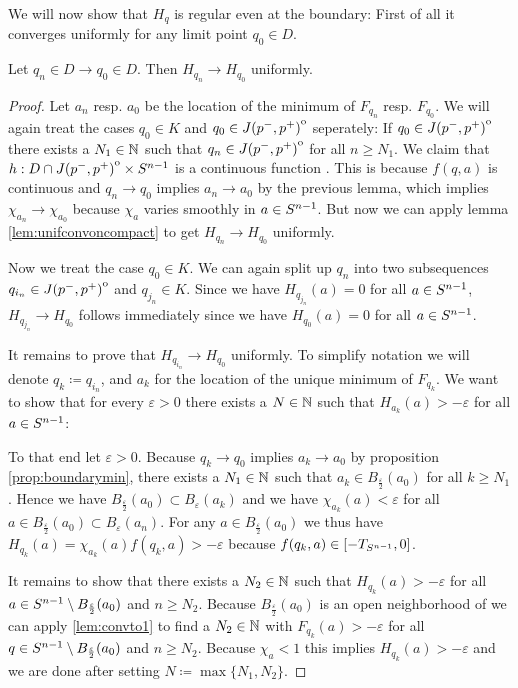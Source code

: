 We will now show that $H_q$ is regular even at the boundary:
First of all it converges uniformly for any limit point $q_0\in D$.
\begin{proposition}\label{prop:hunif}
    Let $q_n\in D\to q_0\in D$. Then $H_{q_n}\to H_{q_0}$ uniformly.
\end{proposition}
\begin{proof}
    Let $a_n$ resp. $a_0$ be the location of the minimum of $F_{q_n}$ resp. $F_{q_0}$.
    We will again treat the cases $q_0\in K$ and $q_0\in {\kern0ptJ(p^-,p^+)}^{\mathrm{o}}$ seperately:
    If $q_0\in {\kern0ptJ(p^-,p^+)}^{\mathrm{o}}$ there exists a $N_1\in \mathbb{N}$ such that $q_n \in {\kern0ptJ(p^-,p^+)}^{\mathrm{o}}$ for all $n\ge N_1$. We claim that $h:D\cap {\kern0ptJ(p^-,p^+)}^{\mathrm{o}}\times {S^{n-1}}$ is a continuous function . This is because $f(q,a)$ is continuous and $q_n\to q_0$ implies $a_n\to a_0$ by the previous lemma, which implies $\chi_{a_n}\to \chi_{a_0}$ because $\chi_a$ varies smoothly in $a\in {S^{n-1}}$. But now we can apply lemma \ref{lem:unifconvoncompact} to get $H_{q_n}\to H_{q_0}$ uniformly.

    Now we treat the case $q_0\in K$. We can again split up $q_n$ into two subsequences $q_{i_n}\in {\kern0ptJ(p^-,p^+)}^{\mathrm{o}}$ and $q_{j_n}\in K$. Since we have $H_{q_{j_n}}(a)=0$ for all $a\in {S^{n-1}}$, $H_{q_{j_n}}\to H_{q_0}$ follows immediately since we have $H_{q_0}(a)=0$ for all $a\in {S^{n-1}}$.

    It remains to prove that $H_{q_{i_n}}\to H_{q_0}$ uniformly. To simplify notation we will denote $q_k\coloneqq q_{i_n}$, and $a_k$ for the location of the unique minimum of $F_{q_k}$. We want to show that for every $\varepsilon>0$ there exists a $N\in \mathbb{N}$ such that $H_{a_k}(a)>-\varepsilon$ for all $a\in {S^{n-1}}$:

    To that end let $\varepsilon>0$. Because $q_k\to q_0$ implies $a_k\to a_0$ by proposition \ref{prop:boundarymin}, there exists a $N_1\in \mathbb{N}$ such that $a_k\in B_\frac{\varepsilon}{2}(a_0)$ for all $k\ge N_1$. Hence we have $B_\frac{\varepsilon}{2}(a_0)\subset B_\varepsilon(a_k)$ and we have $\chi_{a_k}(a)<\varepsilon$ for all $a\in B_\frac{\varepsilon}{2}(a_0)\subset B_\varepsilon(a_n)$.
    For any $a\in B_\frac{\varepsilon}{2}(a_0)$ we thus have $H_{q_k}(a) = \chi_{a_k}(a)f(q_k,a) > -\varepsilon$ because $f(q_k,a)\in [-T_{S^{n-1}},0]$.

    It remains to show that there exists a $N_2\in \mathbb{N}$ such that $H_{q_k}(a) > -\varepsilon$ for all $a\in {S^{n-1}}\setminus B_\frac{\varepsilon}{2}(a_0)$ and $n\ge N_2$. Because $B_\frac{\varepsilon}{2}(a_0)$ is an open neighborhood of we can apply \ref{lem:convto1} to find a $N_2\in \mathbb{N}$ with $F_{q_k}(a) > -\varepsilon$ for all $q\in {S^{n-1}} \setminus B_\frac{\varepsilon}{2}(a_0)$ and $n \ge N_2$. Because $\chi_{a}<1$ this implies $H_{q_k}(a) > -\varepsilon$ and we are done after setting $N\coloneqq  \max \{N_1,N_2\}$.
\end{proof}

